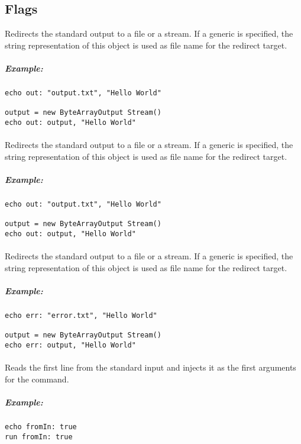 \subsection{Flags}


Redirects the standard output to a
file or a stream. If a generic  is specified, the string
representation of this object is used as file name for the redirect target.

\subparagraph{Example:}

\begin{lstlisting}[style=Groovybash, label={lst:example_flag_in}]
echo out: "output.txt", "Hello World"

output = new ByteArrayOutput Stream()
echo out: output, "Hello World"
\end{lstlisting}

\paragraph{}

Redirects the standard output to a
file or a stream. If a generic  is specified, the string
representation of this object is used as file name for the redirect target.

\subparagraph{Example:}

\begin{lstlisting}[style=Groovybash, label={lst:example_flag_out}]
echo out: "output.txt", "Hello World"

output = new ByteArrayOutput Stream()
echo out: output, "Hello World"
\end{lstlisting}

\paragraph{}

Redirects the standard output to a
file or a stream. If a generic  is specified, the string
representation of this object is used as file name for the redirect target.

\subparagraph{Example:}

\begin{lstlisting}[style=Groovybash, label={lst:example_flag_err}]
echo err: "error.txt", "Hello World"

output = new ByteArrayOutput Stream()
echo err: output, "Hello World"
\end{lstlisting}

\paragraph{}

Reads the first line from the standard input and injects it as the first
arguments for the command.

\subparagraph{Example:}

\begin{lstlisting}[style=Groovybash, label={lst:example_flag_fromin}]
echo fromIn: true
run fromIn: true
\end{lstlisting}

 

